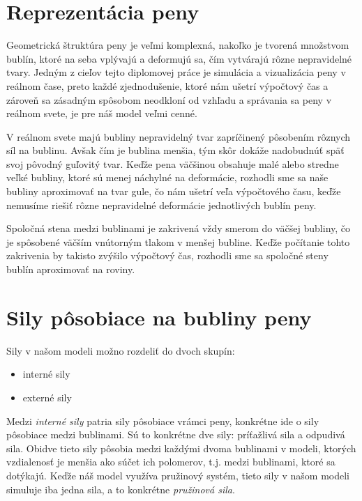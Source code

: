 \section{Reprezentácia peny}

Geometrická štruktúra peny je veľmi komplexná, nakoľko je tvorená množstvom bublín, ktoré na seba vplývajú a deformujú sa, čím vytvárajú rôzne nepravidelné tvary. Jedným z cieľov tejto diplomovej práce je simulácia a vizualizácia peny v reálnom čase, preto každé zjednodušenie, ktoré nám ušetrí výpočtový čas a zároveň sa zásadným spôsobom neodkloní od vzhľadu a správania sa peny v reálnom svete, je pre náš model veľmi cenné. 

V reálnom svete majú bubliny nepravidelný tvar zapríčinený pôsobením rôznych síl na bublinu. Avšak čím je bublina menšia, tým skôr dokáže nadobudnúť späť svoj pôvodný guľovitý tvar. Keďže pena väčšinou obsahuje malé alebo stredne veľké bubliny, ktoré sú menej náchylné na deformácie, rozhodli sme sa naše bubliny aproximovať na tvar gule, čo nám ušetrí veľa výpočtového času, keďže nemusíme riešiť rôzne nepravidelné deformácie jednotlivých bublín peny.

Spoločná stena medzi bublinami je zakrivená vždy smerom do väčšej bubliny, čo je spôsobené väčším vnútorným tlakom v menšej bubline. Keďže počítanie tohto zakrivenia by takisto zvýšilo výpočtový čas, rozhodli sme sa spoločné steny bublín aproximovať na roviny.

\section{Sily pôsobiace na bubliny peny}

\begin{minipage}{\textwidth}
	Sily v našom modeli možno rozdeliť do dvoch skupín:
	\begin{itemize}
		\item interné sily
		\item externé sily
	\end{itemize}
\end{minipage}\newline

Medzi \textit{interné sily} patria sily pôsobiace vrámci peny, konkrétne ide o sily pôsobiace medzi bublinami. Sú to konkrétne dve sily: príťažlivá sila a odpudivá sila. Obidve tieto sily pôsobia medzi každými dvoma bublinami v modeli, ktorých vzdialenosť je menšia ako súčet ich polomerov, t.j. medzi bublinami, ktoré sa dotýkajú. Keďže náš model využíva pružinový systém, tieto sily v našom modeli simuluje iba jedna sila, a to konkrétne \textit{pružinová sila}.

